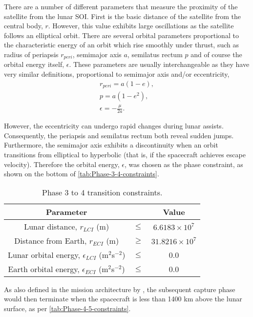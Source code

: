 There are a number of different parameters that measure the proximity of the satellite from the lunar SOI. First is the basic distance of the satellite from the central body, $r$. However, this value exhibits large oscillations as the satellite follows an elliptical orbit. There are several orbital parameters proportional to the characteristic energy of an orbit which rise smoothly under thrust, such as radius of periapsis $r_{peri}$, semimajor axis $a$, semilatus rectum $p$ and of course the orbital energy itself, $\epsilon$. These parameters are usually interchangeable as they have very similar definitions, proportional to semimajor axis and/or eccentricity, 
\begin{gather}
r_{peri} = a(1-e), \\
p = a(1-e^2), \\
\epsilon = -\frac{\mu}{2a}.
\end{gather}

However, the eccentricity can undergo rapid changes during lunar assists. Consequently, the periapsis and semilatus rectum both reveal sudden jumps. Furthermore, the semimajor axis exhibits a discontinuity when an orbit transitions from elliptical to hyperbolic (that is, if the spacecraft achieves escape velocity). Therefore the orbital energy, $\epsilon$, was chosen as the phase constraint, as shown on the bottom of \autoref{tab:Phase-3-4-constraints}.

\begin{table}[ht]
\caption{Phase 3 to 4 transition constraints.} \label{tab:Phase-3-4-constraints}
\centering
\begin{tabular} {ccc}\toprule
Parameter & & Value\\\midrule
Lunar distance, $r_{LCI}$ (m) &$\le$& $6.6183\times 10^7$\\\midrule
Distance from Earth, $r_{ECI}$ (m) &$\ge$& $31.8216\times 10^7$\\\midrule
Lunar orbital energy, $\epsilon_{LCI}$ (m$^2$s$^{-2}$) &$\le$& 0.0 \\\midrule
Earth orbital energy, $\epsilon_{ECI}$ (m$^2$s$^{-2}$) &$\le$& 0.0 \\\bottomrule
\end{tabular}
\end{table}

As also defined in the mission architecture by \textcite{Roeser2006}, the subsequent capture phase would then terminate when the spacecraft is less than 1400 km above the lunar surface, as per \autoref{tab:Phase-4-5-constraints}.

